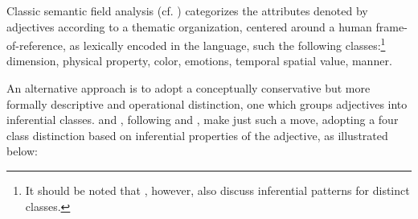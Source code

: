 \documentclass[10pt]{article}
\begin{document}
 
% 


 Classic 
semantic field analysis (cf. \cite{dixon:91,lyons:77,raskin1995lexical})   categorizes the attributes denoted by adjectives according to a thematic organization, centered around a human frame-of-reference, as lexically encoded in  the language, such the following classes:\footnote{It should be noted that \cite{raskin1995lexical} , however, also discuss inferential patterns for distinct classes.}
{\sc dimension}, 
{\sc physical property}, {\sc color}, {\sc emotions}, {\sc temporal}
{\sc spatial}
{\sc value},
{\sc manner}. 

\noindent 
An alternative approach is to 
 adopt a conceptually conservative but more formally descriptive and operational distinction, one which groups adjectives into inferential classes. \cite{amoia2006adjective} and \cite{amoia2008test}, following \cite{Kamp75twotheories} and \cite{Kamp95prototypetheory}, make just such a move, adopting a four class distinction based on inferential properties of the adjective, as illustrated below:
 
\end{document}
